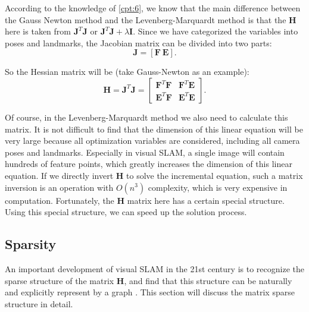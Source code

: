 According to the knowledge of \ref{cpt:6}, we know that the main difference between the Gauss Newton method and the Levenberg-Marquardt method is that the $\mathbf{H}$ here is taken from $\mathbf{J }^T\mathbf{J}$ or $\mathbf{J}^T\mathbf{J}+ \lambda \mathbf{I}$. Since we have categorized the variables into poses and landmarks, the Jacobian matrix can be divided into two parts:
\begin{equation}
	\mathbf{J}=[\mathbf{F} \ \mathbf{E}].
\end{equation}

So the Hessian matrix will be (take Gauss-Newton as an example): 
\begin{equation}\label{eq:HessianMatrix}
	\mathbf{H} = \mathbf{J}^T\mathbf{J} =
	\begin{bmatrix}
		\mathbf{F}^T\mathbf{F}   &   \mathbf{F}^T\mathbf{E}   \\ 
		\mathbf{E}^T\mathbf{F}   &   \mathbf{E}^T\mathbf{E}
	\end{bmatrix} .
\end{equation}

Of course, in the Levenberg-Marquardt method we also need to calculate this matrix. It is not difficult to find that the dimension of this linear equation will be very large because all optimization variables are considered, including all camera poses and landmarks. Especially in visual SLAM, a single image will contain hundreds of feature points, which greatly increases the dimension of this linear equation. If we directly invert $\mathbf{H}$ to solve the incremental equation, such a matrix inversion is an operation  {\cite{Sueli2003}} with $O(n^3)$ complexity, which is very expensive in computation. Fortunately, the $\mathbf{H}$ matrix here has a certain special structure. Using this special structure, we can speed up the solution process.

\subsection{Sparsity}
An important development of visual SLAM in the 21st century is to recognize the sparse structure of the matrix $\mathbf{H}$, and find that this structure can be naturally and explicitly represent by a graph  {\cite{Kummerle2011, Polok2013}}. This section will discuss the matrix sparse structure in detail.

